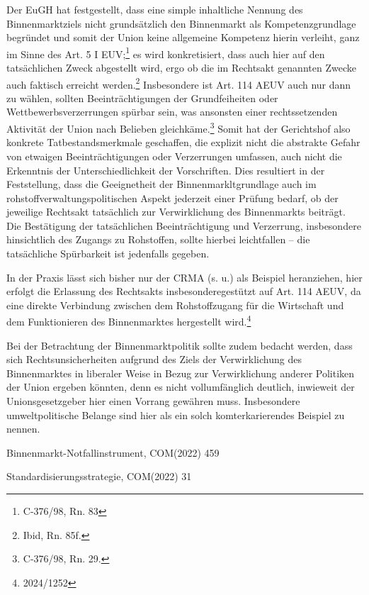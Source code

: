 \documentclass[12pt,a4paper,oneside]{book} %
\begin{document}
	Der EuGH hat festgestellt, dass eine simple inhaltliche Nennung des Binnenmarktziels nicht grundsätzlich den Binnenmarkt als Kompetenzgrundlage begründet und somit der Union keine allgemeine Kompetenz hierin verleiht, ganz im Sinne des Art. 5 I EUV;\footnote{C-376/98, Rn. 83} es wird konkretisiert, dass auch hier auf den tatsächlichen Zweck abgestellt wird, ergo ob die im Rechtsakt genannten Zwecke auch faktisch erreicht werden.\footnote{Ibid, Rn. 85f.} Insbesondere ist Art. 114 AEUV auch nur dann zu wählen, sollten Beeinträchtigungen der Grundfeiheiten oder Wettbewerbsverzerrungen spürbar sein, was ansonsten einer rechtssetzenden Aktivität der Union nach Belieben gleichkäme.\footnote{C-376/98, Rn. 29.} Somit hat der Gerichtshof also konkrete Tatbestandsmerkmale geschaffen, die explizit nicht die abstrakte Gefahr von etwaigen Beeinträchtigungen oder Verzerrungen umfassen, auch nicht die Erkenntnis der Unterschiedlichkeit der Vorschriften.\autocite[hierzu ausführlich]{Callies, Berliner Beiträge 117, S. 16}
	Dies resultiert in der Feststellung, dass die Geeignetheit der Binnenmarkltgrundlage auch im rohstoffverwaltungspolitischen Aspekt jederzeit einer Prüfung bedarf, ob der jeweilige Rechtsakt tatsächlich zur Verwirklichung des Binnenmarkts beiträgt. Die Bestätigung der tatsächlichen Beeinträchtigung und Verzerrung, insbesondere hinsichtlich des Zugangs zu Rohstoffen, sollte hierbei leichtfallen -- die tatsächliche Spürbarkeit ist jedenfalls gegeben.
	
	In der Praxis lässt sich bisher nur der CRMA (s. u.) als Beispiel heranziehen, hier erfolgt die Erlassung des Rechtsakts \grqq insbesondere\glqq gestützt auf Art. 114 AEUV, da eine direkte Verbindung zwischen dem Rohstoffzugang für die Wirtschaft und dem Funktionieren des Binnenmarktes hergestellt wird.\footnote{2024/1252}
	
	Bei der Betrachtung der Binnenmarktpolitik sollte zudem bedacht werden, dass sich Rechtsunsicherheiten aufgrund des Ziels der Verwirklichung des Binnenmarktes in liberaler Weise in Bezug zur Verwirklichung anderer Politiken der Union ergeben könnten, denn es nicht vollumfänglich deutlich, inwieweit der Unionsgesetzgeber hier einen Vorrang gewähren muss.\autocite[§23 Rn 10]{classen_europarecht_2021} Insbesondere umweltpolitische Belange sind hier als ein solch komterkarierendes Beispiel zu nennen.
	
	Binnenmarkt-Notfallinstrument, COM(2022) 459
	
	Standardisierungsstrategie, COM(2022) 31
	
\end{document}
